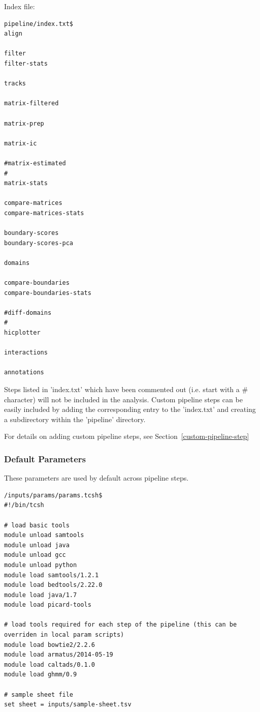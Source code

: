 Index file:
\begin{lstlisting}
pipeline/index.txt$ 
align

filter
filter-stats

tracks

matrix-filtered

matrix-prep

matrix-ic

#matrix-estimated
#
matrix-stats

compare-matrices
compare-matrices-stats

boundary-scores
boundary-scores-pca

domains

compare-boundaries
compare-boundaries-stats

#diff-domains
#
hicplotter

interactions

annotations
\end{lstlisting}

Steps listed in 'index.txt' which have been commented out (i.e. start with a \# character) will not be included in the analysis. Custom pipeline steps can be easily included by adding the corresponding entry to the 'index.txt' and creating a subdirectory within the 'pipeline' directory. 

For details on adding custom pipeline steps, see Section~\ref{custom-pipeline-step}
\subsubsection{Default Parameters}\label{HiC:default-params}
These parameters are used by default across pipeline steps.

\begin{lstlisting}
/inputs/params/params.tcsh$
#!/bin/tcsh

# load basic tools
module unload samtools
module unload java
module unload gcc
module unload python
module load samtools/1.2.1
module load bedtools/2.22.0
module load java/1.7
module load picard-tools

# load tools required for each step of the pipeline (this can be overriden in local param scripts)
module load bowtie2/2.2.6
module load armatus/2014-05-19
module load caltads/0.1.0
module load ghmm/0.9

# sample sheet file
set sheet = inputs/sample-sheet.tsv
\end{lstlisting}
